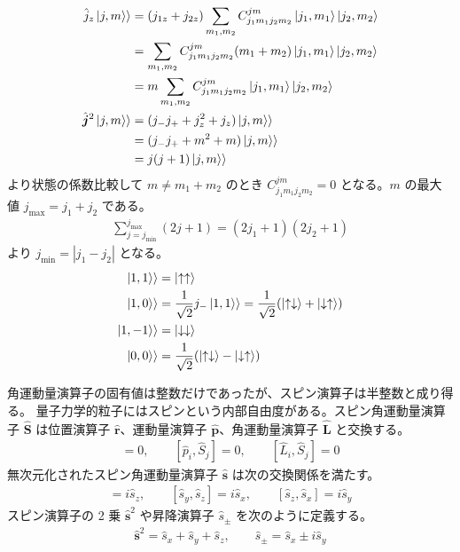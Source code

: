 \documentclass[uplatex,dvipdfmx,a4paper,11pt]{jlreq}
\newcommand{\rr}{\bm{r}}
\newcommand{\pp}{\bm{p}}
\theoremstyle{definition}
\begin{document}
\begin{align}
  \hat{j}_z\ket{j, m}\rangle      & = (j_{1z} + j_{2z})\sum_{m_1, m_2}C_{j_1m_1j_2m_2}^{jm}\ket{j_1, m_1}\ket{j_2, m_2} \\
                                  & = \sum_{m_1, m_2}C_{j_1m_1j_2m_2}^{jm}(m_1 + m_2)\ket{j_1, m_1}\ket{j_2, m_2}       \\
                                  & = m\sum_{m_1, m_2}C_{j_1m_1j_2m_2}^{jm}\ket{j_1, m_1}\ket{j_2, m_2}                 \\
  \hat{\bm{j}}^2\ket{j, m}\rangle & = (j_-j_+ + j_z^2 + j_z)\ket{j, m}\rangle                                           \\
                                  & = (j_-j_+ + m^2 + m)\ket{j, m}\rangle                                               \\
                                  & = j(j + 1)\ket{j, m}\rangle
\end{align}
より状態の係数比較して $m \neq m_1 + m_2$ のとき $C_{j_1m_1j_2m_2}^{jm} = 0$ となる。$m$ の最大値 $j_{\max} = j_1 + j_2$ である。
\begin{align}
  \sum_{j=j_{\min}}^{j_{\max}} (2j + 1) = (2j_1 + 1)(2j_2 + 1)
\end{align}
より $j_{\min} = |j_1 - j_2|$ となる。
\begin{align}
  \ket{1, 1}\rangle  & = \ket{\uparrow\uparrow}                                                                                               \\
  \ket{1, 0}\rangle  & = \frac{1}{\sqrt{2}}j_-\ket{1, 1}\rangle = \frac{1}{\sqrt{2}}\qty(\ket{\uparrow\downarrow} + \ket{\downarrow\uparrow}) \\
  \ket{1, -1}\rangle & = \ket{\downarrow\downarrow}                                                                                           \\
  \ket{0, 0}\rangle  & = \frac{1}{\sqrt{2}}\qty(\ket{\uparrow\downarrow} - \ket{\downarrow\uparrow})
\end{align}

\begin{definition}
  角運動量演算子の固有値は整数だけであったが、スピン演算子は半整数と成り得る。
  量子力学的粒子にはスピンという内部自由度がある。スピン角運動量演算子 $\hat{\bm{S}}$ は位置演算子 $\hat{\rr}$、運動量演算子 $\hat{\pp}$、角運動量演算子 $\hat{\bm{L}}$ と交換する。
  \begin{align}
    [\hat{r}_i, \hat{S}_j] = 0, \qquad [\hat{p}_i, \hat{S}_j] = 0, \qquad [\hat{L}_i, \hat{S}_j] = 0
  \end{align}
  無次元化されたスピン角運動量演算子 $\hat{\bm{s}}$ は次の交換関係を満たす。
  \begin{align}
    [\hat{s}_x, \hat{s}_y] = i\hat{s}_z, \qquad [\hat{s}_y, \hat{s}_z] = i\hat{s}_x, \qquad [\hat{s}_z, \hat{s}_x] = i\hat{s}_y
  \end{align}
  スピン演算子の 2 乗 $\hat{\bm{s}}^2$ や昇降演算子 $\hat{s}_\pm$ を次のように定義する。
  \begin{align}
    \hat{\bm{s}}^2 = \hat{s}_x + \hat{s}_y + \hat{s}_z, \qquad \hat{s}_\pm = \hat{s}_x \pm i\hat{s}_y
  \end{align}
\end{definition}
\end{document}
